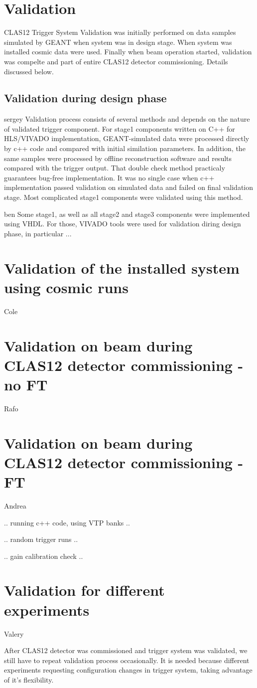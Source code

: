 \section{Validation}

CLAS12 Trigger System Validation was initially performed on data samples simulated by GEANT when system was in design stage. When system was installed cosmic data were used. Finally when beam operation started, validation was compelte and part of entire CLAS12 detector commissioning. Details discussed below.

\subsection{Validation during design phase}

sergey
Validation process consists of several methods and depends on the nature of validated trigger component. For stage1 components written on C++ for HLS/VIVADO implementation, GEANT-simulated data were processed directly by c++ code and compared with initial similation parameters. In addition, the same samples were processed by offline reconstruction software and results compared with the trigger output. That double check method practicaly guarantees bug-free implementation. It was no single case when c++ implementation passed validation on simulated data and failed on final validation stage. Most complicated stage1 components were validated using this method.

ben
Some stage1, as well as all stage2 and stage3 components were implemented using VHDL. For those, VIVADO tools were used for validation diring design phase, in particular ...

\section{Validation of the installed system using cosmic runs} Cole

\section{Validation on beam during CLAS12 detector commissioning - no FT} Rafo

\section{Validation on beam during CLAS12 detector commissioning - FT} Andrea

.. running c++ code, using VTP banks ..

.. random trigger runs .. 

.. gain calibration check .. 


\section{Validation for different experiments} Valery

After CLAS12 detector was commissioned and trigger system was validated, we still have to repeat validation process occasionally. It is needed because different experiments requesting configuration changes in trigger system, taking advantage of it's flexibility.